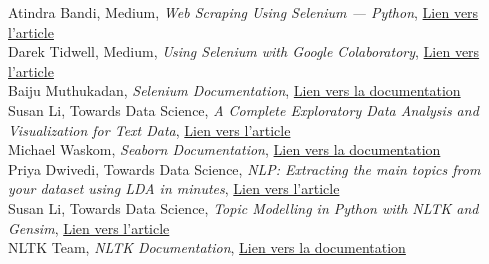 \documentclass[a4paper,french,12pt]{article}
\begin{document}
\begingroup
\renewcommand{\section}[2]{}%
\begin{thebibliography}{9}

    Atindra Bandi, Medium, \textit{Web Scraping Using Selenium — Python}, \href{https://towardsdatascience.com/web-scraping-using-selenium-python-8a60f4cf40ab}{Lien vers l'article}\\
    
    Darek Tidwell, Medium, \textit{Using Selenium with Google Colaboratory}, \href{https://medium.com/@darektidwell1980/using-selenium-with-google-colaboratory-ca4a4f21021f}{Lien vers l'article}\\
    
    Baiju Muthukadan, \textit{Selenium Documentation}, \href{https://selenium-python.readthedocs.io/#}{Lien vers la documentation}\\

    Susan Li, Towards Data Science, \textit{A Complete Exploratory Data Analysis and Visualization for Text Data}, \href{https://towardsdatascience.com/a-complete-exploratory-data-analysis-and-visualization-for-text-data-29fb1b96fb6a}{Lien vers l'article}\\
    
    Michael Waskom, \textit{Seaborn Documentation}, \href{https://seaborn.pydata.org}{Lien vers la documentation}\\

    Priya Dwivedi, Towards Data Science, \textit{NLP: Extracting the main topics from your dataset using LDA in minutes}, \href{https://towardsdatascience.com/nlp-extracting-the-main-topics-from-your-dataset-using-lda-in-minutes-21486f5aa925}{Lien vers l'article}\\
    
    Susan Li, Towards Data Science, \textit{Topic Modelling in Python with NLTK and Gensim}, \href{https://towardsdatascience.com/topic-modelling-in-python-with-nltk-and-gensim-4ef03213cd21}{Lien vers l'article}\\
    
    NLTK Team, \textit{NLTK Documentation}, \href{https://www.nltk.org}{Lien vers la documentation}\\
    

\end{thebibliography}
\end{document}
